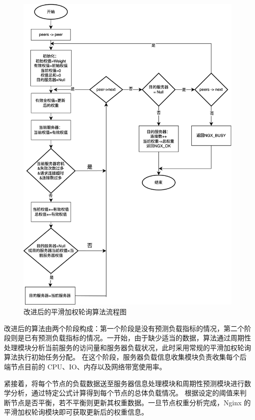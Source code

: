 \begin{figure}[htbp]
	\centering
	\includegraphics[width=\textwidth]{figures/new_smoth_weight_balance.jpg}
	\caption{改进后的平滑加权轮询算法流程图}
	\label{new_smoth_weight_balance}
\end{figure}

改进后的算法由两个阶段构成：第一个阶段是没有预测负载指标的情况，第二个阶段则是已有预测负载指标的情况。一开始，由于缺少适当的数据，算法通过周期性处理模块分析当前服务的访问量和服务器负载状况，此时采用常规的平滑加权轮询算法执行初始任务分配。
在这个阶段，服务器负载信息收集模块负责收集每个后端节点目前的 CPU、IO、内存以及网络带宽使用率。

紧接着，将每个节点的负载数据送至服务器信息处理模块和周期性预测模块进行数学分析，通过特定公式计算得到每个节点的总体负载情况。
根据设定的阈值来判断节点是否平衡，若不平衡则更新其权重数据。一旦节点权重分析完成，Nginx 的平滑加权轮询模块即可获取更新后的权重信息。

